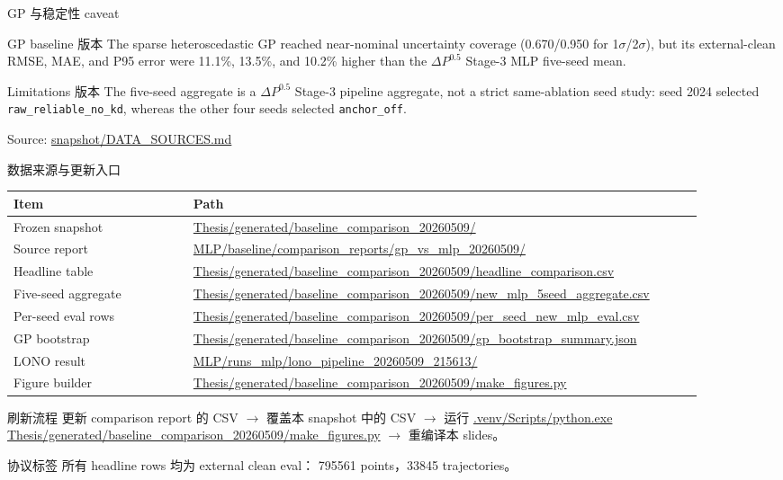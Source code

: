 \documentclass[aspectratio=169,11pt]{beamer}
\newcommand{\sourcepath}[1]{{\scriptsize\url{#1}}}
\newcommand{\sourcenote}[1]{\vfill{\tiny\textcolor{gray!70!black}{Source: \url{#1}}}}
\begin{document}
\begin{frame}{GP 与稳定性 caveat}
\small
\begin{block}{GP baseline 版本}
\footnotesize
The sparse heteroscedastic GP reached near-nominal uncertainty coverage
(0.670/0.950 for 1\(\sigma\)/2\(\sigma\)), but its external-clean RMSE, MAE, and
P95 error were 11.1\%, 13.5\%, and 10.2\% higher than the \(\Delta P^{0.5}\)
Stage-3 MLP five-seed mean.
\end{block}

\begin{block}{Limitations 版本}
\footnotesize
The five-seed aggregate is a \(\Delta P^{0.5}\) Stage-3 pipeline aggregate, not a
strict same-ablation seed study: seed 2024 selected \texttt{raw\_reliable\_no\_kd},
whereas the other four seeds selected \texttt{anchor\_off}.
\end{block}

\sourcenote{snapshot/DATA_SOURCES.md}
\end{frame}

\begin{frame}{数据来源与更新入口}
\scriptsize
\begin{tabular}{L{0.24\linewidth}L{0.68\linewidth}}
\toprule
Item & Path \\
\midrule
Frozen snapshot &
\sourcepath{Thesis/generated/baseline_comparison_20260509/} \\
Source report &
\sourcepath{MLP/baseline/comparison_reports/gp_vs_mlp_20260509/} \\
Headline table &
\sourcepath{Thesis/generated/baseline_comparison_20260509/headline_comparison.csv} \\
Five-seed aggregate &
\sourcepath{Thesis/generated/baseline_comparison_20260509/new_mlp_5seed_aggregate.csv} \\
Per-seed eval rows &
\sourcepath{Thesis/generated/baseline_comparison_20260509/per_seed_new_mlp_eval.csv} \\
GP bootstrap &
\sourcepath{Thesis/generated/baseline_comparison_20260509/gp_bootstrap_summary.json} \\
LONO result &
\sourcepath{MLP/runs_mlp/lono_pipeline_20260509_215613/} \\
Figure builder &
\sourcepath{Thesis/generated/baseline_comparison_20260509/make_figures.py} \\
\bottomrule
\end{tabular}

\vspace{0.6em}
\begin{block}{刷新流程}
\footnotesize
更新 comparison report 的 CSV \(\rightarrow\) 覆盖本 snapshot 中的 CSV
\(\rightarrow\) 运行
\sourcepath{.venv/Scripts/python.exe Thesis/generated/baseline_comparison_20260509/make_figures.py}
\(\rightarrow\) 重编译本 slides。
\end{block}

\begin{block}{协议标签}
\footnotesize
所有 headline rows 均为 external clean eval：
\num{795561} points，\num{33845} trajectories。
\end{block}
\end{frame}
\end{document}
